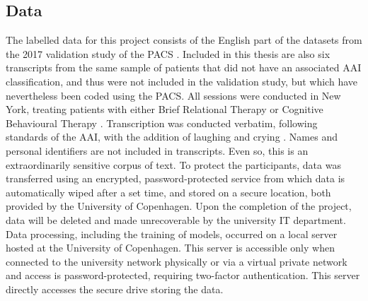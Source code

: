 \documentclass[12pt]{report}
\begin{document}
\subsection{Data}
The labelled data for this project consists of the English part of the datasets from the 2017 validation study of the PACS \cite{Talia2017}.
Included in this thesis are also six transcripts from the same sample of patients that did not have an associated AAI classification, and thus were not included in the validation study, but which have nevertheless been coded using the PACS.
All sessions were conducted in New York, treating patients with either Brief Relational Therapy \cite{Safran2000} or Cognitive Behavioural Therapy \cite{Beck2011}.
Transcription was conducted verbatim, following standards of the AAI, with the addition of laughing and crying \cite{Talia2017, Talia2014}.
Names and personal identifiers are not included in transcripts.
Even so, this is an extraordinarily sensitive corpus of text.
To protect the participants, data was transferred using an encrypted, password-protected service from which data is automatically wiped after a set time, and stored on a secure location, both provided by the University of Copenhagen.
Upon the completion of the project, data will be deleted and made unrecoverable by the university IT department.
Data processing, including the training of models, occurred on a local server hosted at the University of Copenhagen.
This server is accessible only when connected to the university network physically or via a virtual private network and access is password-protected, requiring two-factor authentication.
This server directly accesses the secure drive storing the data.
\end{document}

